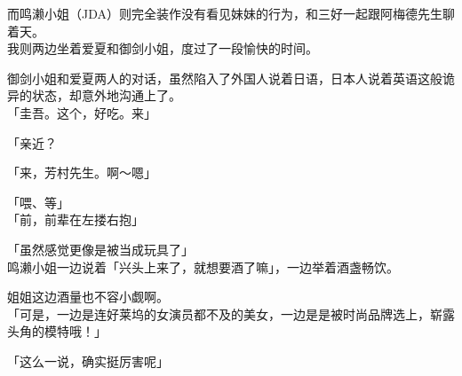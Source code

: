 而鸣濑小姐（JDA）则完全装作没有看见妹妹的行为，和三好一起跟阿梅德先生聊着天。\\

我则两边坐着爱夏和御剑小姐，度过了一段愉快的时间。

御剑小姐和爱夏两人的对话，虽然陷入了外国人说着日语，日本人说着英语这般诡异的状态，却意外地沟通上了。\\

「圭吾。这个，好吃。来」


「亲近？ 


「来，芳村先生。啊～嗯」

「喂、等」\\

「前，前辈在左搂右抱」

「虽然感觉更像是被当成玩具了」\\

鸣濑小姐一边说着「兴头上来了，就想要酒了嘛」，一边举着酒盏畅饮。

姐姐这边酒量也不容小觑啊。\\

「可是，一边是连好莱坞的女演员都不及的美女，一边是是被时尚品牌选上，崭露头角的模特哦！」

「这么一说，确实挺厉害呢」

